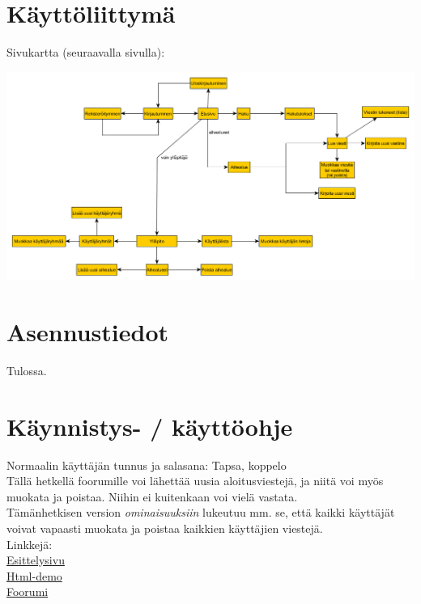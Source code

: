 \documentclass[12pt,a4paper,leqno]{report}
\begin{document}
\chapter{Käyttöliittymä}

Sivukartta (seuraavalla sivulla):

\begin{sideways}
\includegraphics[scale=.6]{sivukartta}
\end{sideways}

\chapter{Asennustiedot}

Tulossa.

\chapter{Käynnistys- / käyttöohje}

Normaalin käyttäjän tunnus ja salasana: Tapsa, koppelo\\

\noindent Tällä hetkellä foorumille voi lähettää uusia aloitusviestejä, ja niitä voi myös muokata ja poistaa. Niihin ei kuitenkaan voi vielä vastata.\\

\noindent Tämänhetkisen version \emph{ominaisuuksiin} lukeutuu mm. se, että kaikki käyttäjät voivat vapaasti muokata ja poistaa kaikkien käyttäjien viestejä.\\

\noindent Linkkejä:\\
\href{http://wlehtoma.users.cs.helsinki.fi/Keskustelufoorumi/esittelysivu.html}{Esittelysivu}\\
\href{http://wlehtoma.users.cs.helsinki.fi/Keskustelufoorumi/html-demo/}{Html-demo}\\
\href{http://wlehtoma.users.cs.helsinki.fi/Keskustelufoorumi/kirjautuminen.php}{Foorumi}
\end{document}

